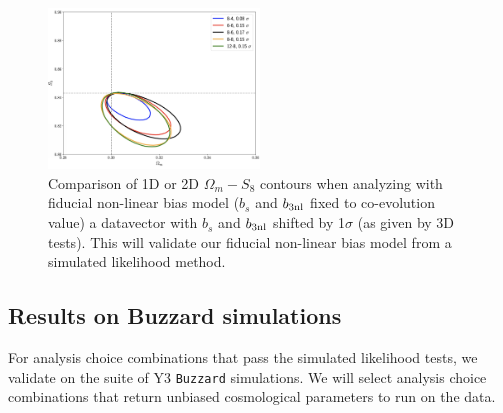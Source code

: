 \documentclass[fleqn,usenatbib]{mnras}
\newcommand{\gammat}{\ensuremath{\gamma_{t}(\theta)}}
\newcommand{\wtheta}{\ensuremath{w(\theta)}}
\newcommand{\lcdm}{$\Lambda$CDM}
\newcommand{\wcdm}{$w$CDM}
\newcommand{\buzzard}{\texttt{Buzzard} }
\begin{document}


\begin{figure}
\includegraphics[width=0.5\textwidth,draft]{figs/temp.png}
\caption[]{Comparison of 1D or 2D $\Omega_m-S_8$ contours when analyzing with fiducial non-linear bias model ($b_s$ and $b_{\rm 3nl}$ fixed to co-evolution value) a datavector with $b_s$ and $b_{\rm 3nl}$ shifted by 1$\sigma$ (as given by 3D tests). This will validate our fiducial non-linear bias model from a simulated likelihood method. }
\label{fig:nlbias_comp}
\end{figure}

\subsection{Results on Buzzard simulations}

For  analysis choice combinations that pass the simulated likelihood tests, we validate on the suite of Y3 \buzzard simulations. We will select analysis choice combinations that return unbiased cosmological parameters to run on the data. 
\end{document}
